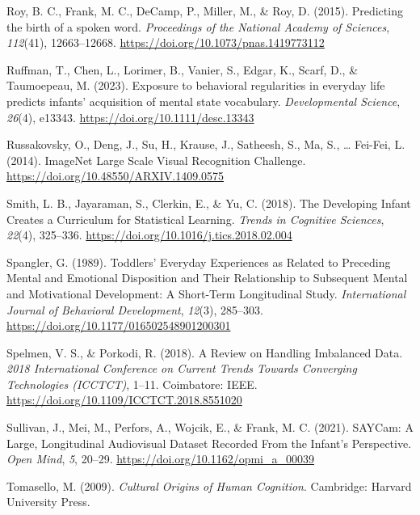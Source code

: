 \documentclass[
  man,floatsintext]{apa6}
\newlength{\cslhangindent}
\newenvironment{CSLReferences}[2] %
 {\begin{list}{}{%
  \setlength{\itemindent}{0pt}
  \setlength{\leftmargin}{0pt}
  \setlength{\parsep}{0pt}
  \ifodd #1
   \setlength{\leftmargin}{\cslhangindent}
   \setlength{\itemindent}{-1\cslhangindent}
  \fi
  \setlength{\itemsep}{#2\baselineskip}}}
 {\end{list}}
\begin{document}
\begin{CSLReferences}{1}{0}
Roy, B. C., Frank, M. C., DeCamp, P., Miller, M., \& Roy, D. (2015). Predicting the birth of a spoken word. \emph{Proceedings of the National Academy of Sciences}, \emph{112}(41), 12663--12668. \url{https://doi.org/10.1073/pnas.1419773112}

Ruffman, T., Chen, L., Lorimer, B., Vanier, S., Edgar, K., Scarf, D., \& Taumoepeau, M. (2023). Exposure to behavioral regularities in everyday life predicts infants' acquisition of mental state vocabulary. \emph{Developmental Science}, \emph{26}(4), e13343. \url{https://doi.org/10.1111/desc.13343}

Russakovsky, O., Deng, J., Su, H., Krause, J., Satheesh, S., Ma, S., \ldots{} Fei-Fei, L. (2014). {ImageNet Large Scale Visual Recognition Challenge}. \url{https://doi.org/10.48550/ARXIV.1409.0575}

Smith, L. B., Jayaraman, S., Clerkin, E., \& Yu, C. (2018). The {Developing Infant Creates} a {Curriculum} for {Statistical Learning}. \emph{Trends in Cognitive Sciences}, \emph{22}(4), 325--336. \url{https://doi.org/10.1016/j.tics.2018.02.004}

Spangler, G. (1989). Toddlers' {Everyday Experiences} as {Related} to {Preceding Mental} and {Emotional Disposition} and {Their Relationship} to {Subsequent Mental} and {Motivational Development}: {A Short-Term Longitudinal Study}. \emph{International Journal of Behavioral Development}, \emph{12}(3), 285--303. \url{https://doi.org/10.1177/016502548901200301}

Spelmen, V. S., \& Porkodi, R. (2018). A {Review} on {Handling Imbalanced Data}. \emph{2018 {International Conference} on {Current Trends} Towards {Converging Technologies} ({ICCTCT})}, 1--11. Coimbatore: IEEE. \url{https://doi.org/10.1109/ICCTCT.2018.8551020}

Sullivan, J., Mei, M., Perfors, A., Wojcik, E., \& Frank, M. C. (2021). {SAYCam}: {A Large}, {Longitudinal Audiovisual Dataset Recorded From} the {Infant}'s {Perspective}. \emph{Open Mind}, \emph{5}, 20--29. \url{https://doi.org/10.1162/opmi_a_00039}

Tomasello, M. (2009). \emph{Cultural {Origins} of {Human Cognition}}. Cambridge: Harvard University Press.


\end{CSLReferences}
\end{document}
